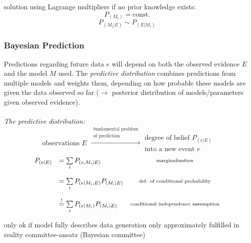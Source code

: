 \begin{itemize}
	\itR solution using Lagrange multipliers
	\itR if no prior knowledge exists:
	\begin{equation}
		P_{(M_i)} = \mathrm{const.}
	\end{equation}
	\begin{equation}
		P_{(M_i|E)} \sim P_{(E|M_i)}
	\end{equation}
\end{itemize}


\subsubsection{Bayesian Prediction}
Predictions regarding future data $e$ will depend on both the observed
evidence $E$ and the model $M$ used. The \emph{predictive distribution} combines predictions from multiple models and weights them, depending on how probable these models are given the data observed so far ($\rightarrow$ posterior distribution of models/parameters given observed evidence).\\\\
\emph{The predictive distribution:}
\begin{equation}
	\substack{ 	\text{observations } E}
	\xrightarrow{ \substack{	\text{fundamental problem} \\
					\text{of prediction}} }
	\substack{	\text{degree of belief } P_{(e|E)} \\
			\text{into a new event } e}
\end{equation}
\begin{equation}
	\begin{array}{llc}
	P_{(e|E)} 
	& = \sum\limits_i P_{(e, M_i|E)}
	& \substack{ \text{marginalization} } \\\\
	& = \sum\limits_i P_{(e|M_i, E)} P_{(M_i|E)}
	& \substack{ \text{def. of conditional probability} } \\\\
	& \stackrel{\mathrm{!}}{=} \sum\limits_i P_{(e|M_i)} P_{(M_i|E)}
	& \substack{ \text{conditional independence assumption} }
	\end{array}
\end{equation}
\begin{itemize}
  \itr only ok if model fully describes data generation
  \itr only approximately fulfilled in reality
  \itR committee-ansatz (Bayesian committee)
\end{itemize}

